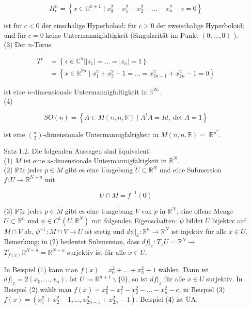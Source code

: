 \documentclass[10pt, letterpaper]{article}
\begin{document}
$$
H_{c}^{n}=\left\{x \in \mathbb{R}^{n+1} \mid x_{0}^{2}-x_{1}^{2}-x_{2}^{2}-\ldots-x_{n}^{2}-c=0\right\}
$$

ist für $c<0$ der einschalige Hyperboloid; für $c>0$ der zweischalige Hyperboloid; und für $c=0$ keine Untermannigfaltigkeit (Singularität im Punkt $(0, \ldots, 0)$ ).\\
(3) Der $n$-Torus

$$
\begin{aligned}
T^{n} & =\left\{z \in \mathbb{C}^{n}| | z_{1}\left|=\ldots=\left|z_{n}\right|=1\right\}\right. \\
& =\left\{x \in \mathbb{R}^{2 n} \mid x_{1}^{2}+x_{2}^{2}-1=\ldots=x_{2 n-1}^{2}+x_{2 n}^{2}-1=0\right\}
\end{aligned}
$$

ist eine $n$-dimensionale Untermannigfaltigkeit in $\mathbb{R}^{2 n}$.\\
(4)

$$
S O(n)=\left\{A \in M(n, n, \mathbb{R}) \mid A^{t} A=I d, \operatorname{det} A=1\right\}
$$

ist eine $\binom{n}{2}$-dimensionale Untermannigfaltigkeit in $M(n, n, \mathbb{R})=$ $\mathbb{R}^{n^{2}}$.

Satz 1.2. Die folgenden Aussagen sind äquivalent:\\
(1) $M$ ist eine $n$-dimensionale Untermannigfaltigkeit in $\mathbb{R}^{N}$.\\
(2) Für jedes $p \in M$ gibt es eine Umgebung $U \subset \mathbb{R}^{N}$ und eine Submersion $f: U \rightarrow \mathbb{R}^{N-n}$ mit

$$
U \cap M=f^{-1}(0)
$$

(3) Für jedes $p \in M$ gibt es eine Umgebung $V$ von $p$ in $\mathbb{R}^{N}$, eine offene Menge $U \subset \mathbb{R}^{n}$ und $\psi \in C^{1}\left(U, \mathbb{R}^{N}\right)$ mit folgenden Eigenschaften: $\psi$ bildet $U$ bijektiv auf $M \cap V$ ab, $\psi^{-1}: M \cap V \rightarrow U$ ist stetig und $\left.d \psi\right|_{x}: \mathbb{R}^{n} \rightarrow \mathbb{R}^{N}$ ist injektiv für alle $x \in U$.\\
Bemerkung: in (2) bedeutet Submersion, dass $\left.d f\right|_{x}: T_{x} U=\mathbb{R}^{N} \rightarrow$ $T_{f(x)} \mathbb{R}^{N-n}=\mathbb{R}^{N-n}$ surjektiv ist für alle $x \in U$.

In Beispiel (1) kann man $f(x)=x_{0}^{2}+\ldots+x_{n}^{2}-1$ wählen. Dann ist $\left.d f\right|_{x}=2\left(x_{0}, \ldots, x_{n}\right)$. Ist $U:=\mathbb{R}^{n+1} \backslash\{0\}$, so ist $\left.d f\right|_{x}$ für alle $x \in U$ surjektiv. In Beispiel (2) wählt man $f(x)=x_{0}^{2}-x_{1}^{2}-x_{2}^{2}-\ldots-x_{n}^{2}-c$, in Beispiel (3) $f(x)=\left(x_{1}^{2}+x_{2}^{2}-1, \ldots, x_{2 n-1}^{2}+x_{2 n}^{2}-1\right)$. Beispiel (4) ist ÜA.
\end{document}
